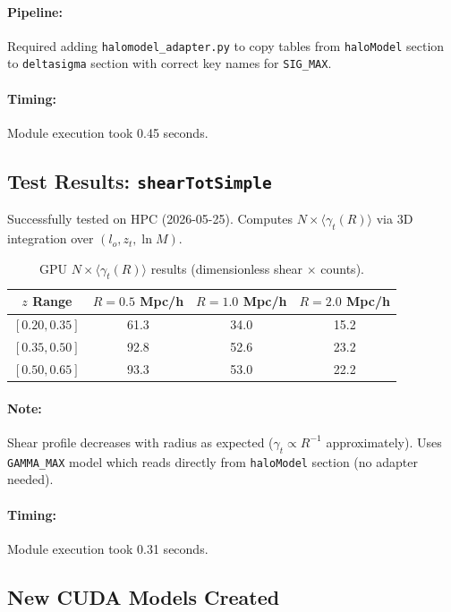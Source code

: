 \documentclass[a4paper, 11pt]{article}
\begin{document}
\paragraph{Pipeline:} Required adding \texttt{halomodel\_adapter.py} to copy tables from \texttt{haloModel} section to \texttt{deltasigma} section with correct key names for \texttt{SIG\_MAX}.

\paragraph{Timing:} Module execution took 0.45 seconds.

\subsection{Test Results: \texttt{shearTotSimple}}

Successfully tested on HPC (2026-05-25). Computes $N \times \langle\gamma_t(R)\rangle$ via 3D integration over $(l_o, z_t, \ln M)$.

\begin{table}[H]
\centering
\begin{tabular}{@{}c c c c@{}}
\toprule
$z$ Range & $R=0.5$ Mpc/h & $R=1.0$ Mpc/h & $R=2.0$ Mpc/h \\
\midrule
$[0.20, 0.35]$ & 61.3 & 34.0 & 15.2 \\
$[0.35, 0.50]$ & 92.8 & 52.6 & 23.2 \\
$[0.50, 0.65]$ & 93.3 & 53.0 & 22.2 \\
\bottomrule
\end{tabular}
\caption{GPU $N \times \langle\gamma_t(R)\rangle$ results (dimensionless shear $\times$ counts).}
\end{table}

\paragraph{Note:} Shear profile decreases with radius as expected ($\gamma_t \propto R^{-1}$ approximately). Uses \texttt{GAMMA\_MAX} model which reads directly from \texttt{haloModel} section (no adapter needed).

\paragraph{Timing:} Module execution took 0.31 seconds.

\subsection{New CUDA Models Created}
\end{document}

